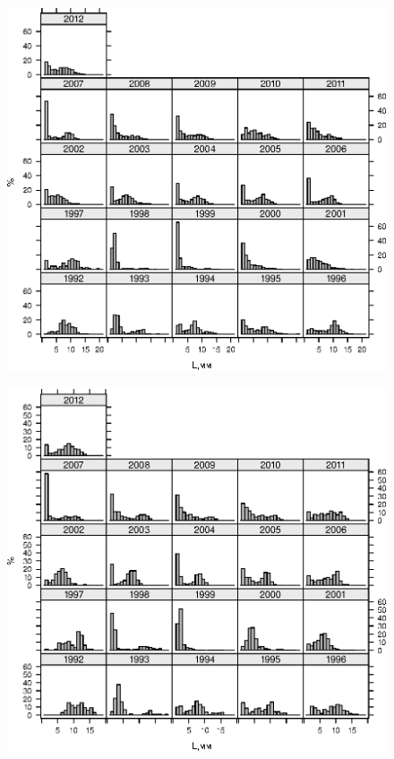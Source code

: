 \documentclass[12pt, a4paper]{article}
\begin{document}
	\begin{figure}[ht]
		\includegraphics[height=0.45\textheight]{Nazarova_fig3.eps}	
	\end{figure}

	\begin{figure}[ht]
		\includegraphics[height=0.45\textheight]{Nazarova_fig4.eps}	
	\end{figure}
\end{document}
